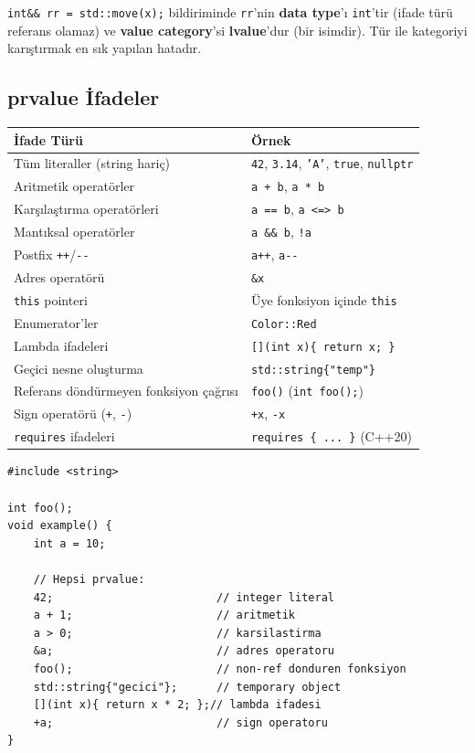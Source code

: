 \documentclass[a4paper,12pt]{article}
\begin{document}
\begin{notebox}
\texttt{int\&\& rr = std::move(x);} bildiriminde \texttt{rr}'nin \textbf{data type}'ı \texttt{int}'tir (ifade türü referans olamaz) ve \textbf{value category}'si \textbf{lvalue}'dur (bir isimdir). Tür ile kategoriyi karıştırmak en sık yapılan hatadır.
\end{notebox}

\subsection{prvalue İfadeler}

\begin{table}[h]
\centering
\small
\begin{tabular}{@{}p{5.5cm}p{5.5cm}@{}}
\toprule
\textbf{İfade Türü} & \textbf{Örnek} \\
\midrule
Tüm literaller (string hariç) & \texttt{42}, \texttt{3.14}, \texttt{'A'}, \texttt{true}, \texttt{nullptr} \\
Aritmetik operatörler & \texttt{a + b}, \texttt{a * b} \\
Karşılaştırma operatörleri & \texttt{a == b}, \texttt{a <=> b} \\
Mantıksal operatörler & \texttt{a \&\& b}, \texttt{!a} \\
Postfix \texttt{++}/\texttt{-{}-} & \texttt{a++}, \texttt{a-{}-} \\
Adres operatörü & \texttt{\&x} \\
\texttt{this} pointeri & Üye fonksiyon içinde \texttt{this} \\
Enumerator'ler & \texttt{Color::Red} \\
Lambda ifadeleri & \texttt{[](int x)\{ return x; \}} \\
Geçici nesne oluşturma & \texttt{std::string\{"temp"\}} \\
Referans döndürmeyen fonksiyon çağrısı & \texttt{foo()} (\texttt{int foo();}) \\
Sign operatörü (\texttt{+}, \texttt{-}) & \texttt{+x}, \texttt{-x} \\
\texttt{requires} ifadeleri & \texttt{requires \{ ... \}} (C++20) \\
\bottomrule
\end{tabular}
\end{table}

\begin{lstlisting}
#include <string>

int foo();
void example() {
    int a = 10;

    // Hepsi prvalue:
    42;                         // integer literal
    a + 1;                      // aritmetik
    a > 0;                      // karsilastirma
    &a;                         // adres operatoru
    foo();                      // non-ref donduren fonksiyon
    std::string{"gecici"};      // temporary object
    [](int x){ return x * 2; };// lambda ifadesi
    +a;                         // sign operatoru
}
\end{lstlisting}
\end{document}
